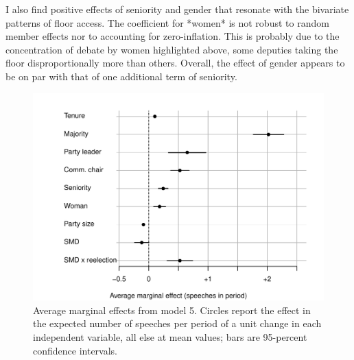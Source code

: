 \documentclass[letter,12pt]{article}
\begin{document}

I also find positive effects of seniority and gender that resonate with the bivariate patterns of floor access. The coefficient for *women* is not robust to random member effects nor to accounting for zero-inflation. This is probably due to the concentration of debate by women highlighted above, some deputies taking the floor disproportionally more than others. Overall, the effect of gender appears to be on par with that of one additional term of seniority. 

\begin{figure}
  \centering
    \includegraphics[width=.67\columnwidth]{../plots/avgMgEffects.pdf}
    \caption{Average marginal effects from model 5. Circles report the effect in the expected number of speeches per period of a unit change in each independent variable, all else at mean values; bars are 95-percent confidence intervals.}\label{F:avgmgeff}
\end{figure}

\end{document}
